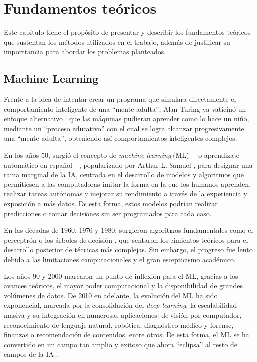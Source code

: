 \chapter{Fundamentos teóricos}

Este capítulo tiene el propósito de presentar y describir los fundamentos teóricos que sustentan los métodos 
utilizados en el trabajo, además de justificar su importtancia para abordar los problemas planteados.


\section{Machine Learning}

Frente a la idea de intentar crear un programa que simulara directamente el comportamiento inteligente de una ``mente adulta'', Alan Turing ya vaticinó un enfoque alternativo \cite{turing1950}: que las máquinas pudieran aprender como lo hace un niño, mediante un ``proceso educativo'' con el cual se logra alcanzar progresivamente una ``mente adulta'', obteniendo así comportamientos inteligentes complejos.

En los años 50, surgió el concepto de \textit{machine learning} (\acrshort{ML}) ---o aprendizaje automático en español---, popularizado por Arthur L. Samuel \cite{samuel1959}, para designar una rama marginal de la \acrshort{IA}, centrada en el desarrollo de modelos y algoritmos que permitiesen a las computadoras imitar la forma en la que los humanos aprenden, realizar tareas autónomas y mejorar su rendimiento a través de la experiencia y exposición a más datos. De esta forma, estos modelos podrían realizar predicciones o tomar decisiones sin ser programados para cada caso.

En las décadas de 1960, 1970 y 1980, surgieron algoritmos fundamentales como el perceptrón \cite{mcculloch1943,rosenblatt1958} o los árboles de decisión \cite{quinlan1986}, que sentaron los cimientos teóricos para el desarrollo posterior de técnicas más complejas. Sin embargo, el progreso fue lento debido a las limitaciones computacionales y el gran escepticismo académico. 

Los años 90 y 2000 marcaron un punto de inflexión para el \acrshort{ML}, gracias a los avances teóricos, el mayor poder computacional y la disponibilidad de grandes volúmenes de datos. De 2010 en adelante, la evolución del \acrshort{ML} ha sido exponencial, marcada por la consolidación del \textit{deep learning}, la escalabilidad masiva y su integración en numerosas aplicaciones: de visión por computador, reconocimiento de lenguaje natural, robótica, diagnóstico médico y forense, finanzas o recomendación de contenidos, entre otros. De esta forma, el \acrshort{ML} se ha convertido en un campo tan amplio y exitoso que ahora ``eclipsa'' al resto de campos de la \acrshort{IA} \cite{domingos2015}.

